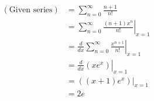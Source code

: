 \item

\begin{align*}
	(\text{Given series})
	 & = \sum_{n = 0}^\infty \frac{n + 1}{n!}                                         \\
	 & = \left. \sum_{n = 0}^\infty \frac{(n + 1) x^n}{n!} \right|_{x = 1}            \\
	 & = \left. \frac{d}{dx} \sum_{n = 0}^\infty \frac{x^{n + 1}}{n!} \right|_{x = 1} \\
	 & = \left. \frac{d}{dx} \left( xe^x \right) \right|_{x = 1}                      \\
	 & = \left. \left( (x + 1) e^x \right) \right|_{x = 1}                            \\
	 & = 2e
\end{align*}
